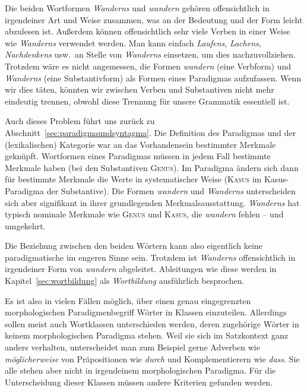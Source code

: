 Die beiden Wortformen \textit{Wanderns} und \textit{wandern} gehören offensichtlich in irgendeiner Art und Weise zusammen, was an der Bedeutung und der Form leicht abzulesen ist.
Außerdem können offensichtlich sehr viele Verben in einer Weise wie \textit{Wanderns} verwendet werden.
Man kann einfach \textit{Laufens}, \textit{Lachens}, \textit{Nachdenkens} usw.\ an Stelle von \textit{Wanderns} einsetzen, um dies nachzuvollziehen.
Trotzdem wäre es nicht angemessen, die Formen \textit{wandern} (eine Verbform) und \textit{Wanderns} (eine Substantivform) als Formen eines Paradigmas aufzufassen.
Wenn wir dies täten, könnten wir zwischen Verben und Substantiven nicht mehr eindeutig trennen, obwohl diese Trennung für unsere Grammatik essentiell ist.

Auch dieses Problem führt uns zurück zu Abschnitt~\ref{sec:paradigmaundsyntagma}.
Die Definition des Paradigmas und der (lexikalischen) Kategorie war an das Vorhandensein bestimmter Merkmale geknüpft.
Wortformen eines Paradigmas müssen in jedem Fall bestimmte Merkmale haben (bei den Substantiven \zB \textsc{Genus}).
Im Paradigma ändern sich dann für bestimmte Merkmale die Werte in systematischer Weise (\zB \textsc{Kasus} im Kasus-Paradigma der Substantive).
Die Formen \textit{wandern} und \textit{Wanderns} unterscheiden sich aber signifikant in ihrer grundlegenden Merkmalsausstattung.
\textit{Wanderns} hat typisch nominale Merkmale wie \textsc{Genus} und \textsc{Kasus}, die \textit{wandern} fehlen -- und umgekehrt.

\begin{exe}
\end{exe}


Die Beziehung zwischen den beiden Wörtern kann also eigentlich keine paradigmatische im engeren Sinne sein.
Trotzdem ist \textit{Wanderns} offensichtlich in irgendeiner Form von \textit{wandern} abgeleitet.
Ableitungen wie diese werden in Kapitel~\ref{sec:wortbildung} als \textit{Wortbildung} ausführlich besprochen.

Es ist also in vielen Fällen möglich, über einen genau eingegrenzten morphologischen Paradigmenbegriff Wörter in Klassen einzuteilen.
Allerdings sollen meist auch Wortklassen unterschieden werden, deren zugehörige Wörter in keinem morphologischen Paradigma stehen.
Weil sie sich im Satzkontext ganz anders verhalten, unterscheidet man zum Beispiel gerne Adverben wie \textit{möglicherweise} von Präpositionen wie \textit{durch} und Komplementierern wie \textit{dass}.
Sie alle stehen aber nicht in irgendeinem morphologischen Paradigma.
Für die Unterscheidung dieser Klassen müssen andere Kriterien gefunden werden.

